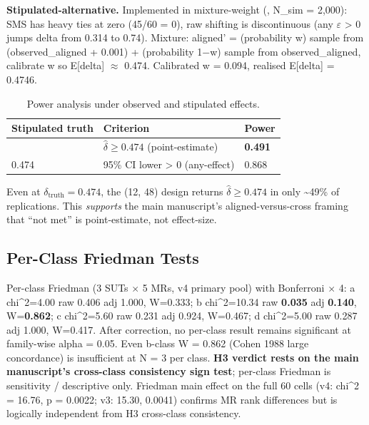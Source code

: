 \documentclass[manuscript,screen,review]{acmart}
\begin{document}
\textbf{Stipulated-alternative.} Implemented in
mixture-weight (,
N\_sim = 2,000): SMS has heavy ties at zero (45/60 = 0), raw shifting is
discontinuous (any $\varepsilon$ \textgreater{} 0 jumps delta from 0.314 to 0.74).
Mixture: aligned' = (probability w) sample from (observed\_aligned +
0.001) + (probability 1$-$w) sample from observed\_aligned, calibrate w so
E{[}delta{]} $\approx$ 0.474. Calibrated w = 0.094, realised E{[}delta{]} =
0.4746.

{%
\begin{longtable}[]{@{}lll@{}}
\caption{Power analysis under observed and stipulated effects.}\label{tab:p2-24}\\
\toprule\noalign{}
Stipulated truth & Criterion & Power \\
\midrule\noalign{}
\endfirsthead
\endhead
\bottomrule\noalign{}
\endlastfoot
0.474 & $\hat{\delta} \geq 0.474$ (point-estimate) & \textbf{0.491} \\
0.474 & 95\% CI lower \textgreater{} 0 (any-effect) & 0.868 \\
\end{longtable}
}

Even at $\delta_{\mathrm{truth}} = 0.474$, the (12, 48) design returns $\hat{\delta} \geq
0.474$ in only \textasciitilde49\% of replications. This
\emph{supports} the main manuscript's aligned-versus-cross framing that ``not met'' is point-estimate, not
effect-size.

\subsection{Per-Class Friedman Tests}\label{d.4-friedman-per-class-discussion-of-small-n-concordance}

Per-class Friedman (3 SUTs $\times$ 5 MRs, v4 primary pool) with Bonferroni
$\times$ 4: a chi\^{}2=4.00
raw 0.406 adj 1.000, W=0.333; b chi\^{}2=10.34 raw \textbf{0.035} adj
\textbf{0.140}, W=\textbf{0.862}; c chi\^{}2=5.60 raw 0.231 adj 0.924,
W=0.467; d chi\^{}2=5.00 raw 0.287 adj 1.000, W=0.417. After correction,
no per-class result remains significant at family-wise alpha = 0.05.
Even b-class W = 0.862 (Cohen 1988 large concordance) is insufficient at
N = 3 per class. \textbf{H3 verdict rests on the main manuscript's cross-class consistency sign test}; per-class
Friedman is sensitivity / descriptive only. Friedman main effect on the full
60 cells (v4: chi\^{}2 = 16.76, p = 0.0022; v3: 15.30, 0.0041) confirms
MR rank differences but
is logically independent from H3 cross-class consistency.
\end{document}
